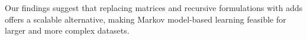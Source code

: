 Our findings suggest that replacing matrices and recursive formulations with \glspl{add} offers a scalable alternative, making Markov model-based learning feasible for larger and more complex datasets.




